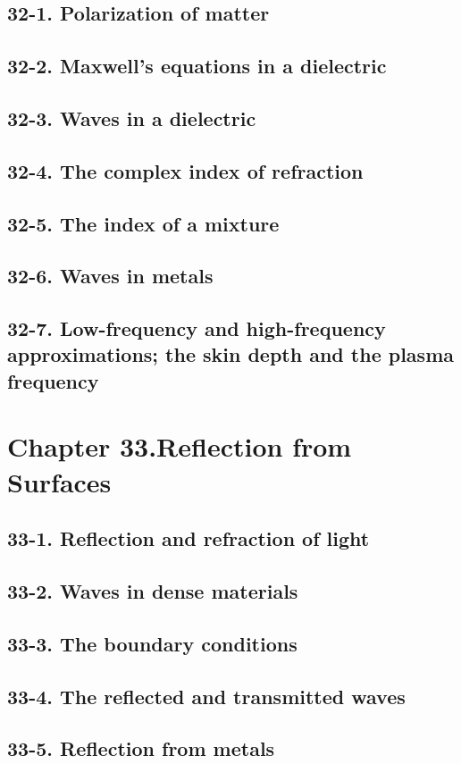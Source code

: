 \documentclass{article}
\begin{document}
\subsection{32-1. Polarization of matter}
\subsection{32-2. Maxwell’s equations in a dielectric}
\subsection{32-3. Waves in a dielectric}
\subsection{32-4. The complex index of refraction}
\subsection{32-5. The index of a mixture}
\subsection{32-6. Waves in metals}
\subsection{32-7. Low-frequency and high-frequency approximations; the skin depth and the plasma frequency}
\section{Chapter 33.Reflection from Surfaces}
\subsection{33-1. Reflection and refraction of light}
\subsection{33-2. Waves in dense materials}
\subsection{33-3. The boundary conditions}
\subsection{33-4. The reflected and transmitted waves}
\subsection{33-5. Reflection from metals}
\end{document}
